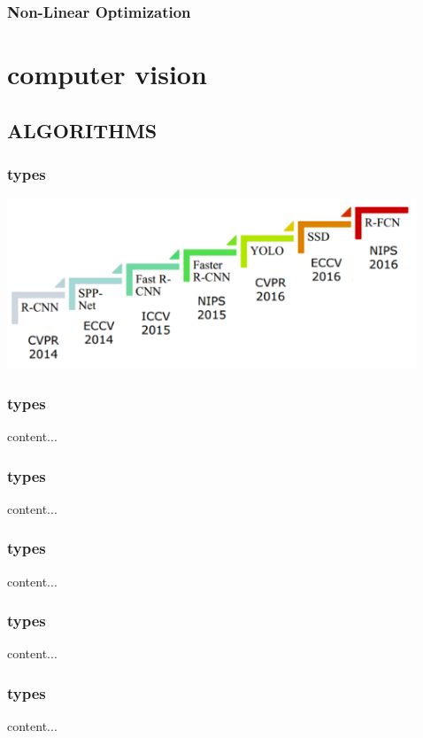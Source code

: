 \documentclass{beamer}
\begin{document}
\begin{frame}\frametitle{Non-Linear Optimization}
	
\end{frame}








\section{computer vision}


\subsection{ALGORITHMS}

\begin{frame}\frametitle{types}
	\includegraphics[scale=0.4]{cv/cnntypes}
\end{frame}

\begin{frame}\frametitle{types}
content...
\end{frame}

\begin{frame}\frametitle{types}
content...
\end{frame}

\begin{frame}\frametitle{types}
content...
\end{frame}

\begin{frame}\frametitle{types}
content...
\end{frame}

\begin{frame}\frametitle{types}
content...
\end{frame}
\end{document}
